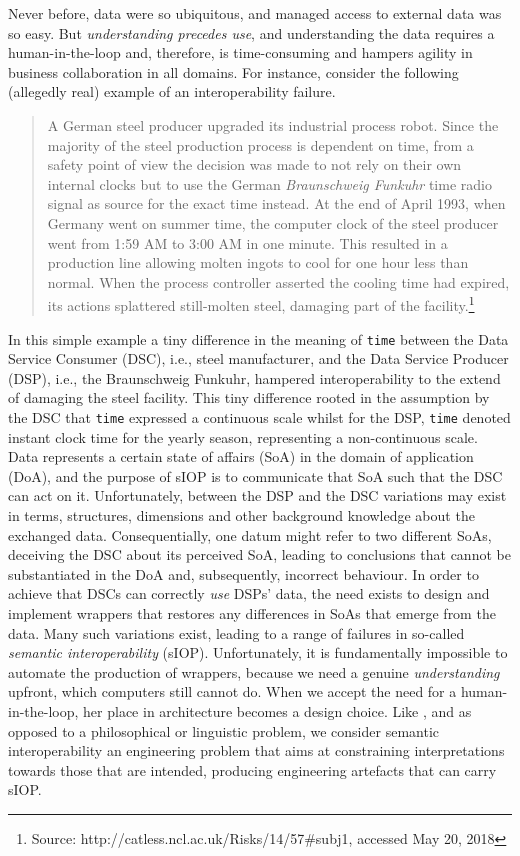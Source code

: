 \documentclass[sort&compress,preprint,authoryear,3p,twocolumn]{elsarticle}
\begin{document}
Never before, data were so ubiquitous, and managed access to external
data was so easy. But \emph{understanding precedes use}, and
understanding the data requires a human-in-the-loop and, therefore, is
time-consuming and hampers agility in business collaboration in all
domains. For instance, consider the following (allegedly real) example
of an interoperability failure.

\begin{quote}
A German steel producer upgraded its industrial process robot. Since the
majority of the steel production process is dependent on time, from a
safety point of view the decision was made to not rely on their own
internal clocks but to use the German \emph{Braunschweig Funkuhr} time
radio signal as source for the exact time instead. At the end of April
1993, when Germany went on summer time, the computer clock of the steel
producer went from 1:59 AM to 3:00 AM in one minute. This resulted in a
production line allowing molten ingots to cool for one hour less than
normal. When the process controller asserted the cooling time had
expired, its actions splattered still-molten steel, damaging part of the
facility.\footnote{Source: http://catless.ncl.ac.uk/Risks/14/57\#subj1,
  accessed May 20, 2018}
\end{quote}

In this simple example a tiny difference in the meaning of \texttt{time}
between the Data Service Consumer (DSC), i.e., steel manufacturer, and
the Data Service Producer (DSP), i.e., the Braunschweig Funkuhr,
hampered interoperability to the extend of damaging the steel facility.
This tiny difference rooted in the assumption by the DSC that
\texttt{time} expressed a continuous scale whilst for the DSP,
\texttt{time} denoted instant clock time for the yearly season,
representing a non-continuous scale. Data represents a certain state of
affairs (SoA) in the domain of application (DoA), and the purpose of
sIOP is to communicate that SoA such that the DSC can act on it.
Unfortunately, between the DSP and the DSC variations may exist in
terms, structures, dimensions and other background knowledge about the
exchanged data. Consequentially, one datum might refer to two different
SoAs, deceiving the DSC about its perceived SoA, leading to conclusions
that cannot be substantiated in the DoA and, subsequently, incorrect
behaviour. In order to achieve that DSCs can correctly \emph{use} DSPs'
data, the need exists to design and implement wrappers that restores any
differences in SoAs that emerge from the data. Many such variations
exist, leading to a range of failures in so-called \emph{semantic
interoperability} (sIOP). Unfortunately, it is fundamentally impossible
to automate the production of wrappers, because we need a genuine
\emph{understanding} upfront, which computers still cannot do. When we
accept the need for a human-in-the-loop, her place in architecture
becomes a design choice. Like \citep{Kuhn2009}, and as opposed to a
philosophical or linguistic problem, we consider semantic
interoperability an engineering problem that aims at constraining
interpretations towards those that are intended, producing engineering
artefacts that can carry sIOP.
\end{document}

